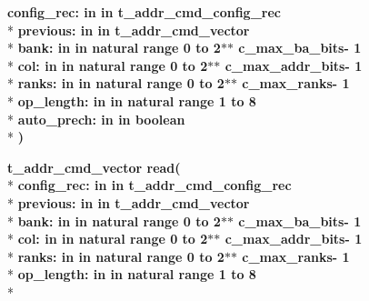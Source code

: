 \begin{DoxyCompactItemize}
{\bfseries \textcolor{vhdlchar}{config\+\_\+rec\+: }\textcolor{stringliteral}{in }\textcolor{vhdlchar}{in t\+\_\+addr\+\_\+cmd\+\_\+config\+\_\+rec}}\\*
{\bfseries \textcolor{vhdlchar}{previous\+: }\textcolor{stringliteral}{in }\textcolor{vhdlchar}{in t\+\_\+addr\+\_\+cmd\+\_\+vector}}\\*
{\bfseries \textcolor{vhdlchar}{bank\+: }\textcolor{stringliteral}{in }\textcolor{vhdlchar}{in natural   range  0 to  2$\ast$$\ast$   c\+\_\+max\+\_\+ba\+\_\+bits-\/ 1}}\\*
{\bfseries \textcolor{vhdlchar}{col\+: }\textcolor{stringliteral}{in }\textcolor{vhdlchar}{in natural   range  0 to  2$\ast$$\ast$   c\+\_\+max\+\_\+addr\+\_\+bits-\/ 1}}\\*
{\bfseries \textcolor{vhdlchar}{ranks\+: }\textcolor{stringliteral}{in }\textcolor{vhdlchar}{in natural   range  0 to  2$\ast$$\ast$   c\+\_\+max\+\_\+ranks-\/ 1}}\\*
{\bfseries \textcolor{vhdlchar}{op\+\_\+length\+: }\textcolor{stringliteral}{in }\textcolor{vhdlchar}{in natural   range  1 to  8}}\\*
{\bfseries \textcolor{vhdlchar}{auto\+\_\+prech\+: }\textcolor{stringliteral}{in }\textcolor{vhdlchar}{in boolean}}\\*
{\bfseries  )} 
\item 
{\bfseries {\bfseries \textcolor{vhdlchar}{t\+\_\+addr\+\_\+cmd\+\_\+vector}\textcolor{vhdlchar}{ }}} {\bf read}{\bfseries  ( }\\*
{\bfseries \textcolor{vhdlchar}{config\+\_\+rec\+: }\textcolor{stringliteral}{in }\textcolor{vhdlchar}{in t\+\_\+addr\+\_\+cmd\+\_\+config\+\_\+rec}}\\*
{\bfseries \textcolor{vhdlchar}{previous\+: }\textcolor{stringliteral}{in }\textcolor{vhdlchar}{in t\+\_\+addr\+\_\+cmd\+\_\+vector}}\\*
{\bfseries \textcolor{vhdlchar}{bank\+: }\textcolor{stringliteral}{in }\textcolor{vhdlchar}{in natural   range  0 to  2$\ast$$\ast$   c\+\_\+max\+\_\+ba\+\_\+bits-\/ 1}}\\*
{\bfseries \textcolor{vhdlchar}{col\+: }\textcolor{stringliteral}{in }\textcolor{vhdlchar}{in natural   range  0 to  2$\ast$$\ast$   c\+\_\+max\+\_\+addr\+\_\+bits-\/ 1}}\\*
{\bfseries \textcolor{vhdlchar}{ranks\+: }\textcolor{stringliteral}{in }\textcolor{vhdlchar}{in natural   range  0 to  2$\ast$$\ast$   c\+\_\+max\+\_\+ranks-\/ 1}}\\*
{\bfseries \textcolor{vhdlchar}{op\+\_\+length\+: }\textcolor{stringliteral}{in }\textcolor{vhdlchar}{in natural   range  1 to  8}}\\*

\end{DoxyCompactItemize}
